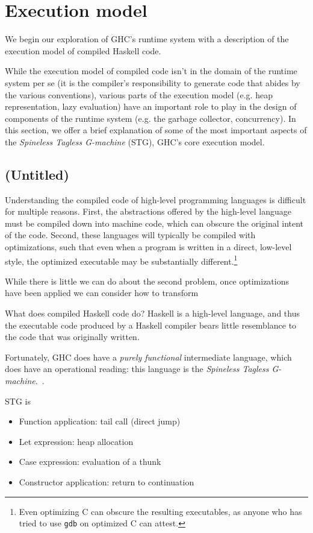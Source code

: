 \section{Execution model}

We begin our exploration of GHC's runtime system with a description
of the execution model of compiled Haskell code.

While the execution model of compiled code isn't in the domain of the
runtime system per se (it is the compiler's responsibility to generate
code that abides by the various conventions), various parts of the
execution model (e.g. heap representation, lazy evaluation) have an important
role to play in the design of components of the runtime system (e.g. the
garbage collector, concurrency).  In this section, we offer a brief
explanation of some of the most important aspects of the \emph{Spineless Tagless G-machine} (STG),
GHC's core execution model.


\subsection{(Untitled)}

Understanding the compiled code of high-level programming languages is
difficult for multiple reasons.  First, the abstractions offered by the
high-level language must be compiled down into machine code, which can
obscure the original intent of the code. Second, these languages will
typically be compiled with optimizations, such that even when a program
is written in a direct, low-level style, the optimized executable may be
substantially different.\footnote{Even optimizing C can obscure the
resulting executables, as anyone who has tried to use \texttt{gdb} on
optimized C can attest.}

While there is little we can do about the second problem, once optimizations
have been applied we can consider how to transform

What does compiled Haskell code do?  Haskell is a high-level language,
and thus the executable code produced by a Haskell compiler bears little
resemblance to the code that was originally written.

Fortunately, GHC does have a \emph{purely
functional} intermediate language, which does have an operational
reading: this language is the \emph{Spineless Tagless
G-machine}.~\cite{PeytonJones1992}.

STG is 

\begin{itemize}
    \item Function application: tail call (direct jump)
    \item Let expression: heap allocation
    \item Case expression: evaluation of a thunk
    \item Constructor application: return to continuation
\end{itemize}



